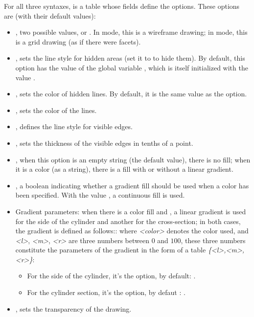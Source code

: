 For all three syntaxes,  is a table whose fields define the options. These options are (with their default values):
\begin{itemize}
    \item {}, two possible values,  or . In  mode, this is a wireframe drawing; in  mode, this is a grid drawing (as if there were facets).

    \item {}, sets the line style for hidden areas (set it to  to hide them). By default, this option has the value of the global variable , which is itself initialized with the value .

    \item  {}, sets the color of hidden lines. By default, it is the same value as the  option.

    \item {}, sets the color of the lines.
    
    \item {}, defines the line style for visible edges.

    \item {}, sets the thickness of the visible edges in tenths of a point.    

    \item {}, when this option is an empty string (the default value), there is no fill; when it is a color (as a string), there is a fill with or without a linear gradient.
    
    \item {}, a boolean indicating whether a gradient fill should be used when a color has been specified. With the value \false, a continuous fill is used.

    \item Gradient parameters: when there is a color fill and , a linear gradient is used for the side of the cylinder and another for the cross-section; in both cases, the gradient is defined as follows::
    where \emph{<color>} denotes the color used, and \emph{<l>}, \emph{<m>}, \emph{<r>} are three numbers between $0$ and $100$, these three numbers constitute the parameters of the gradient in the form of a table \emph{\{<l>,<m>,<r>\}}:
        \begin{itemize}
            \item For the side of the cylinder, it's the  option, by default: .
            \item For the cylinder section, it's the  option, by defaut : .
        \end{itemize}
        
    \item {}, sets the transparency of the drawing.
\end{itemize}


